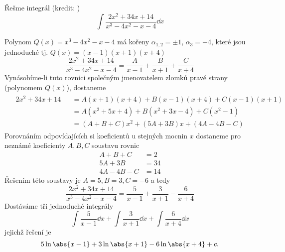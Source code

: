 \begin{mdframed}[style=mdexam]
  \begin{example}\label{MAI:exam115}
    Řešme integrál  (kredit: \cite[s.~90]{Knichal})
    \begin{equation}
      \int{\frac{2x^2+34x+14}{x^3-4x^2-x-4}}\dd{x}
    \end{equation}
    
    Polynom $Q(x)=x^3-4x^2-x-4$ má kořeny $\alpha_{1,2}=\pm1$, $\alpha_{3}=-4$, které jsou
    jednoduché tj. $Q(x)=(x-1)(x+1)(x+4)$ $$\frac{2x^2+34x+14}{x^3-4x^2-x-4} =
    \frac{A}{x-1}+\frac{B}{x+1}+\frac{C}{x+4}$$ Vynásobíme-li tuto rovnici společným
    jmenovatelem zlomků pravé strany (polynomem $Q(x)$), dostaneme
    \begin{gather*}
        \begin{flalign*}
          & 2x^2+34x+14 &&= A(x+1)(x+4)+B(x-1)(x+4)+C(x-1)(x+1) \\
          &             &&= A(x^2+5x+4)+B(x^2+3x-4)+C(x^2-1)    \\
          &             &&= (A+B+C)x^2+(5A+3B)x + (4A-4B-C)
        \end{flalign*}
    \end{gather*}
    Porovnáním odpovídajících si koeficientů u stejných mocnin $x$  dostaneme pro nez\-ná\-mé
    koeficienty $A, B, C$ soustavu rovnic
    \begin{align*}
       A+   B + C &= 2 \\
      5A + 3B     &= 34 \\
      4A - 4B - C &= 14
    \end{align*}
    Řešením této soustavy je $A = 5, B = 3, C = -6$ a tedy
    $$\frac{2x^2+34x+14}{x^3-4x^2-x-4} = \frac{5}{x-1}+\frac{3}{x+1}-\frac{6}{x+4}$$
    Dostáváme tři jednoduché integrály
    \begin{equation*}
      \int{\frac{5}{x-1}}\dd{x} + \int{\frac{3}{x+1}}\dd{x} + \int{\frac{6}{x+4}}\dd{x}            
    \end{equation*}
    jejichž řešení je 
    \begin{equation*}
      5\ln\abs{x-1} +  3\ln\abs{x+1} - 6\ln\abs{x+4} +c.
    \end{equation*}
  \end{example}
\end{mdframed}